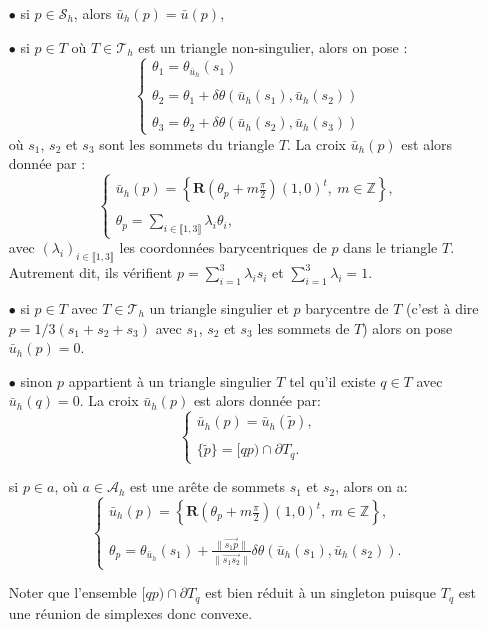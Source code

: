 \begin{itemize}
\item[$\bullet$] si $p\in\mathcal{S}_h$, alors $\bar{u}_h(p)=\bar{u}(p)$,\\[-0.2cm]
\item[$\bullet$] si $p\in T$ où $T\in\mathcal{T}_h$ est un triangle non-singulier, alors on pose :%
$$
\left\{
\begin{array}{l}
\theta_1 = \theta_{\bar{u}_h}(s_1)\\\\
\theta_2 = \theta_1 + \delta\theta(\bar{u}_h(s_1),\bar{u}_h(s_2))\\\\
\theta_3 = \theta_2 + \delta\theta(\bar{u}_h(s_2),\bar{u}_h(s_3))
\end{array}
\right.
$$
où $s_1$, $s_2$ et $s_3$ sont les sommets du triangle $T$. La croix $\bar{u}_h(p)$ est alors donnée par :
$$
\left\{
\begin{array}{l}
\bar{u}_h(p)=\displaystyle\left\{\mathbf{R}\left(\theta_p+m\frac{\pi}{2}\right)(1,0)^t,~m\in\mathbb{Z}\right\},\\\\
\theta_p=\displaystyle\sum_{i\in\llbracket1, 3\rrbracket}\lambda_i\theta_i,
\end{array}
\right.
$$
avec $(\lambda_i)_{i\in\llbracket 1, 3\rrbracket}$ les coordonnées barycentriques de $p$ dans le triangle $T$. Autrement dit, ils vérifient $p=\sum_{i=1}^3\lambda_i s_i$ et $\sum_{i=1}^3\lambda_i=1$.
\\[-0.2cm]
\item[$\bullet$] si $p\in T$ avec $T\in\mathcal{T}_h$ un triangle singulier  et $p$ barycentre de $T$ (c'est à dire $p=1/3(s_1+s_2+s_3)$ avec $s_1$, $s_2$ et $s_3$ les sommets de $T$) alors on pose $\bar{u}_h(p)=0$.\\[-0.2cm]
\item[$\bullet$] sinon $p$ appartient à un triangle singulier $T$ tel qu'il existe $q\in T$ avec $\bar{u}_h(q)=0$. La croix $\bar{u}_h(p)$ est alors donnée par:
$$
\left\{
\begin{array}{l}
\bar{u}_h(p)=\bar{u}_h(\widetilde{p}),\\\\
\{\widetilde{p}\}=[qp)\cap\partial T_q.
\end{array}
\right.
$$


si $p\in a$, où $a\in\mathcal{A}_h$ est une arête de sommets $s_1$ et $s_2$, alors on a:
$$
\left\{
\begin{array}{l}
\bar{u}_h(p)=\displaystyle\left\{\mathbf{R}\left(\theta_p+m\frac{\pi}{2}\right)(1,0)^t,~m\in\mathbb{Z}\right\},\\\\
\theta_p=\theta_{\bar{u}_h}(s_1)+\displaystyle\frac{\|\overrightarrow{s_1p}\|}{\|\overrightarrow{s_1s_2}\|}\delta\theta(\bar{u}_h(s_1),\bar{u}_h(s_2)).
\end{array}
\right.
$$


Noter que l'ensemble $[qp)\cap\partial T_q$ est bien réduit à un singleton puisque $T_q$ est une réunion de simplexes donc convexe.
\end{itemize}


